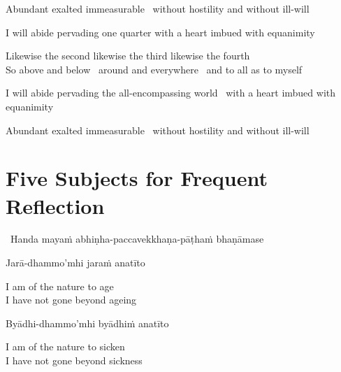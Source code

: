 \begin{english-hang}
  Abundant exalted immeasurable \breathmark\ without hostility and without ill-will
\end{english-hang}

\smallskip

\begin{english-hang}
  I will abide pervading one quarter with a heart imbued with equanimity
\end{english-hang}

\begin{english}
  Likewise the second likewise the third likewise the fourth\\
  So above and below \breathmark\ around and everywhere \breathmark\ and to all as to myself
\end{english}

\begin{english-hang}
  I will abide pervading the all-encompassing world \breathmark\ with a heart imbued with equanimity
\end{english-hang}

\begin{english-hang}
  Abundant exalted immeasurable \breathmark\ without hostility and without ill-will
\end{english-hang}

\suttaRef{[DN 13]}


\section{Five Subjects for Frequent Reflection}
\label{five-reflections}

\begin{leader}
  \anglebracketleft\ \hspace{-0.5mm}Handa mayaṁ abhiṇha-paccavekkhaṇa-pāṭhaṁ bhaṇāmase \hspace{-0.5mm}\anglebracketright\
\end{leader}

Jarā-dhammo'mhi jaraṁ anatīto

\begin{english}
  I am of the nature to age\\
  I have not gone beyond ageing
\end{english}

Byādhi-dhammo'mhi byādhiṁ anatīto

\begin{english}
  I am of the nature to sicken\\
  I have not gone beyond sickness
\end{english}

